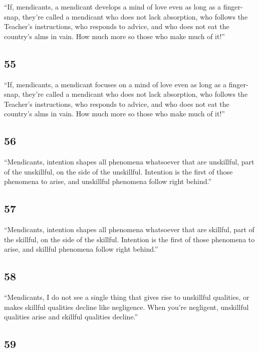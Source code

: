 \documentclass[12pt,openany]{book}%
\begin{document}
“If, mendicants, a mendicant develops a mind of love even as long as a finger-snap, they’re called a mendicant who does not lack absorption, who follows the Teacher’s instructions, who responds to advice, and who does not eat the country’s alms in vain. How much more so those who make much of it!” 

\subsection*{55 }

“If, mendicants, a mendicant focuses on a mind of love even as long as a finger-snap, they’re called a mendicant who does not lack absorption, who follows the Teacher’s instructions, who responds to advice, and who does not eat the country’s alms in vain. How much more so those who make much of it!” 

\subsection*{56 }

“Mendicants, intention shapes all phenomena whatsoever that are unskillful, part of the unskillful, on the side of the unskillful. Intention is the first of those phenomena to arise, and unskillful phenomena follow right behind.” 

\subsection*{57 }

“Mendicants, intention shapes all phenomena whatsoever that are skillful, part of the skillful, on the side of the skillful. Intention is the first of those phenomena to arise, and skillful phenomena follow right behind.” 

\subsection*{58 }

“Mendicants, I do not see a single thing that gives rise to unskillful qualities, or makes skillful qualities decline like negligence. When you’re negligent, unskillful qualities arise and skillful qualities decline.” 

\subsection*{59 }
\end{document}
